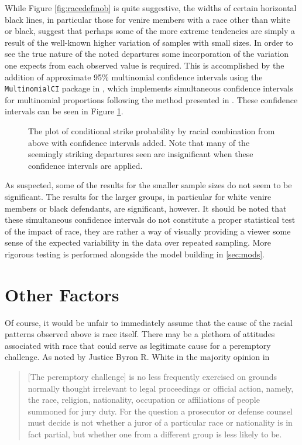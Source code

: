 While Figure \ref{fig:racedefmob} is quite suggestive, the widths of certain horizontal black lines, in particular those for
venire members with a race other than white or black, suggest that perhaps some of the more extreme tendencies are simply a result
of the well-known higher variation of samples with small sizes. In order to see the true nature of the noted departures some
incorporation of the variation one expects from each observed value is required. This is accomplished by the addition of
approximate 95\%  multinomial confidence intervals using the \texttt{MultinomialCI} package in \Rp, which implements simultaneous
confidence intervals for multinomial proportions following the method presented in \cite{sison1995}. These confidence intervals
can be seen in Figure \ref{fig:racedefci}.

\begin{figure}[!h]
  \centering
  \caption[Racial Combination and Strikes with Confidence Intervals]{The plot of conditional strike probability by racial
    combination from above with confidence intervals added. Note that many of the seemingly striking departures seen are
    insignificant when these confidence intervals are applied.}
  \label{fig:racedefci}
\end{figure}

As suspected, some of the results for the smaller sample sizes do not seem to be significant. The results for the larger groups,
in particular for white venire members or black defendants, are significant, however. It should be noted that these simultaneous
confidence intervals do not constitute a proper statistical test of the impact of race, they are rather a way of visually
providing a viewer some sense of the expected variability in the data over repeated sampling. More rigorous testing is performed
alongside the model building in \ref{sec:mods}.

\section{Other Factors} \label{sec:otherfact}

Of course, it would be unfair to immediately assume that the cause of the racial patterns observed above is race itself. There
may be a plethora of attitudes associated with race that could serve as legitimate cause for a peremptory challenge. As noted by 
Justice Byron R. White in the majority opinion in \cite{swainvalabama}

\begin{quote}
  [The peremptory challenge] is no less frequently exercised on grounds normally thought irrelevant to legal proceedings or
  official action, namely, the race, religion, nationality, occupation or affiliations of people summoned for jury duty. For the
  question a prosecutor or defense counsel must decide is not whether a juror of a particular race or nationality is in fact
  partial, but whether one from a different group is less likely to be.
\end{quote}

